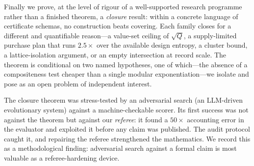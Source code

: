 \documentclass[11pt,oneside]{book}
\theoremstyle{plain}
\theoremstyle{definition}
\theoremstyle{remark}
\begin{document}
Finally we prove, at the level of rigour of a well-supported research
programme rather than a finished theorem, a \emph{closure} result: within a
concrete language of certificate schemas, no construction beats covering.
Each family closes for a different and quantifiable reason---a value-set
ceiling of $\sqrt{Q}$, a supply-limited purchase plan that runs $2.5\times$
over the available design entropy, a cluster bound, a lattice-isolation
argument, or an empty intersection at record scale. The theorem is
conditional on two named hypotheses, one of which---the absence of a
compositeness test cheaper than a single modular exponentiation---we isolate
and pose as an open problem of independent interest.

The closure theorem was stress-tested by an adversarial search
(an LLM-driven evolutionary system) against a machine-checkable
scorer. Its first success was not against the theorem but against our
\emph{referee}: it found a $50\times$ accounting error in the evaluator and
exploited it before any claim was published. The audit protocol caught it,
and repairing the referee strengthened the mathematics. We record this as a
methodological finding: adversarial search against a formal claim is most
valuable as a referee-hardening device.

\tableofcontents

\mainmatter








\appendix

\end{document}
